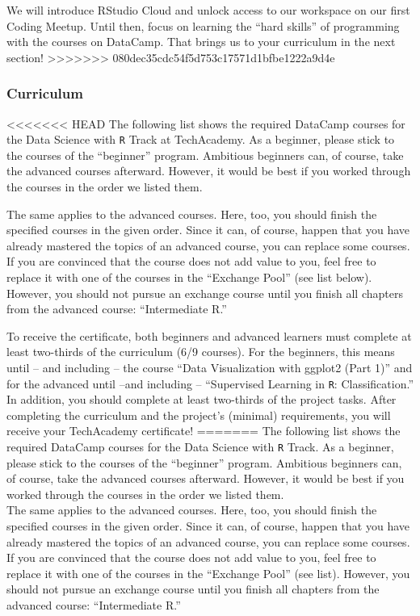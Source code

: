 \documentclass[
  11pt,
]{article}
\begin{document}
We will introduce RStudio Cloud and unlock access to our workspace on our first Coding Meetup. Until then, focus on learning the ``hard skills'' of programming with the courses on DataCamp. That brings us to your curriculum in the next section!
>>>>>>> 080dec35cdc54f5d753c17571d1bfbe1222a9d4e

\hypertarget{curriculum}{%
\subsubsection{Curriculum}\label{curriculum}}

<<<<<<< HEAD
The following list shows the required DataCamp courses for the Data Science with \texttt{R} Track at TechAcademy.
As a beginner, please stick to the courses of the ``beginner'' program.
Ambitious beginners can, of course, take the advanced courses afterward.
However, it would be best if you worked through the courses in the order we listed them.

The same applies to the advanced courses.
Here, too, you should finish the specified courses in the given order.
Since it can, of course, happen that you have already mastered the topics of an advanced course, you can replace some courses.
If you are convinced that the course does not add value to you, feel free to replace it with one of the courses in the ``Exchange Pool'' (see list below).
However, you should not pursue an exchange course until you finish all chapters from the advanced course: ``Intermediate R.''

To receive the certificate, both beginners and advanced learners must complete at least two-thirds of the curriculum (6/9 courses).
For the beginners, this means until -- and including -- the course ``Data Visualization with ggplot2 (Part 1)'' and for the advanced until --and including -- ``Supervised Learning in \texttt{R}: Classification.'' In addition, you should complete at least two-thirds of the project tasks.
After completing the curriculum and the project's (minimal) requirements, you will receive your TechAcademy certificate!
=======
The following list shows the required DataCamp courses for the Data Science with \texttt{R} Track. As a beginner, please stick to the courses of the ``beginner'' program. Ambitious beginners can, of course, take the advanced courses afterward. However, it would be best if you worked through the courses in the order we listed them.\\
The same applies to the advanced courses. Here, too, you should finish the specified courses in the given order. Since it can, of course, happen that you have already mastered the topics of an advanced course, you can replace some courses. If you are convinced that the course does not add value to you, feel free to replace it with one of the courses in the ``Exchange Pool'' (see list). However, you should not pursue an exchange course until you finish all chapters from the advanced course: ``Intermediate R.''
\end{document}
